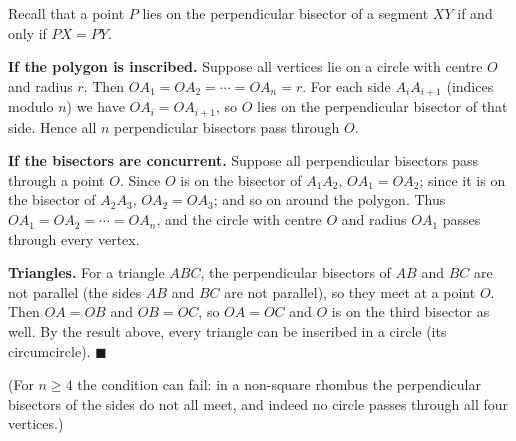 Recall that a point $P$ lies on the perpendicular bisector of a segment $XY$ if and only if $PX=PY$.

\textbf{If the polygon is inscribed.} Suppose all vertices lie on a circle with centre $O$ and radius $r$. Then $OA_1=OA_2=\cdots=OA_n=r$. For each side $A_iA_{i+1}$ (indices modulo $n$) we have $OA_i=OA_{i+1}$, so $O$ lies on the perpendicular bisector of that side. Hence all $n$ perpendicular bisectors pass through $O$.

\textbf{If the bisectors are concurrent.} Suppose all perpendicular bisectors pass through a point $O$. Since $O$ is on the bisector of $A_1A_2$, $OA_1=OA_2$; since it is on the bisector of $A_2A_3$, $OA_2=OA_3$; and so on around the polygon. Thus $OA_1=OA_2=\cdots=OA_n$, and the circle with centre $O$ and radius $OA_1$ passes through every vertex.


\textbf{Triangles.} For a triangle $ABC$, the perpendicular bisectors of $AB$ and $BC$ are not parallel (the sides $AB$ and $BC$ are not parallel), so they meet at a point $O$. Then $OA=OB$ and $OB=OC$, so $OA=OC$ and $O$ is on the third bisector as well. By the result above, every triangle can be inscribed in a circle (its circumcircle). $\blacksquare$

(For $n\ge4$ the condition can fail: in a non-square rhombus the perpendicular bisectors of the sides do not all meet, and indeed no circle passes through all four vertices.)
